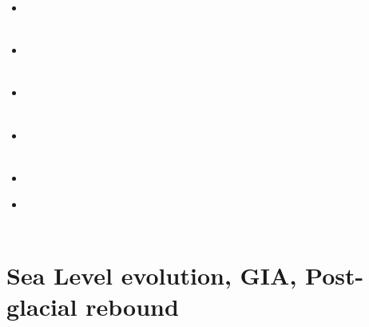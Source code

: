 \begin{scriptsize}
\begin{itemize}
\item[\twothousandfifteen] 
\textcite{feka15} \\
\textcite{cofk15} \\
\item[\twothousandsixteen] 
\textcite{masg16} \\
\textcite{albe16} \\
\item[\twothousandseventeen] 
\textcite{grbe17} \\
\textcite{henf17} \\
\item[\twothousandnineteen] 
\textcite{hadv19} \\
\textcite{clcc19} \\
\item[\twothousandtwentyone]
\textcite{haao21} \\ 
\item[\twothousandtwentytwo]
\textcite{pihg22} \\
\textcite{spbk22} \\
\end{itemize}
\end{scriptsize}

\section{Sea Level evolution, GIA, Post-glacial rebound}

